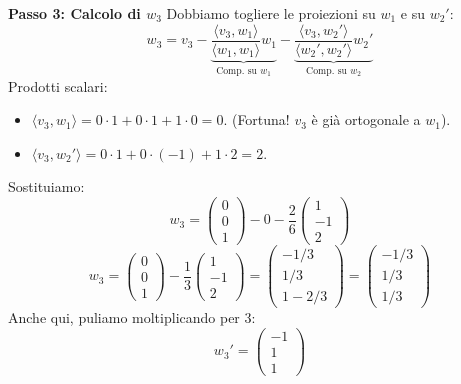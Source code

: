 \documentclass[10pt,a4paper]{article}
\begin{document}
\textbf{Passo 3: Calcolo di $w_3$}
Dobbiamo togliere le proiezioni su $w_1$ e su $w_2'$:
\[ w_3 = v_3 - \underbrace{\frac{\langle v_3, w_1 \rangle}{\langle w_1, w_1 \rangle} w_1}_{\text{Comp. su } w_1} - \underbrace{\frac{\langle v_3, w_2' \rangle}{\langle w_2', w_2' \rangle} w_2'}_{\text{Comp. su } w_2} \]
Prodotti scalari:
\begin{itemize}
    \item $\langle v_3, w_1 \rangle = 0 \cdot 1 + 0 \cdot 1 + 1 \cdot 0 = 0$. (Fortuna! $v_3$ è già ortogonale a $w_1$).
    \item $\langle v_3, w_2' \rangle = 0 \cdot 1 + 0 \cdot (-1) + 1 \cdot 2 = 2$.
\end{itemize}
Sostituiamo:
\[ w_3 = \begin{pmatrix} 0 \\ 0 \\ 1 \end{pmatrix} - 0 - \frac{2}{6} \begin{pmatrix} 1 \\ -1 \\ 2 \end{pmatrix} \]
\[ w_3 = \begin{pmatrix} 0 \\ 0 \\ 1 \end{pmatrix} - \frac{1}{3} \begin{pmatrix} 1 \\ -1 \\ 2 \end{pmatrix} = \begin{pmatrix} -1/3 \\ 1/3 \\ 1 - 2/3 \end{pmatrix} = \begin{pmatrix} -1/3 \\ 1/3 \\ 1/3 \end{pmatrix} \]
Anche qui, puliamo moltiplicando per 3:
\[ w_3' = \begin{pmatrix} -1 \\ 1 \\ 1 \end{pmatrix} \]
\end{document}

